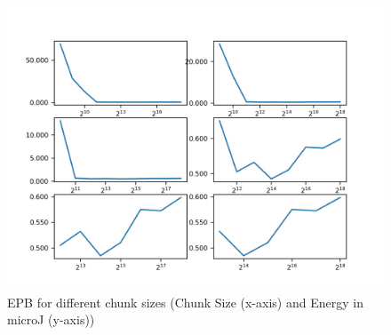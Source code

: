 \begin{figure}
    \begin{center}
        \includegraphics[scale=0.23]{Figs/epbpi.png}    
    \end{center}
    \caption{EPB for different chunk sizes (Chunk Size (x-axis) and Energy in microJ (y-axis))}
    \label{fig:epbpi}
\end{figure}

